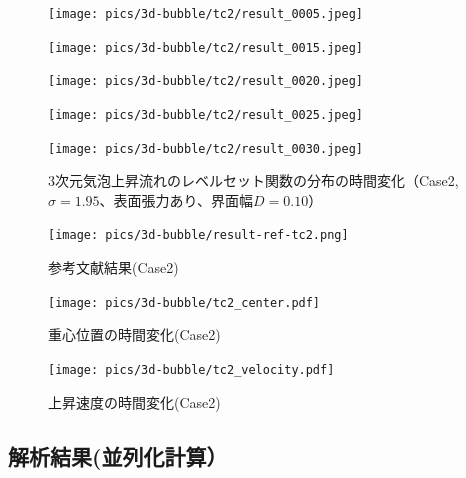 \begin{figure}[H]
	\centering
	\begin{minipage}[b]{0.16\columnwidth}
	    \centering
	    \texttt{[image: pics/3d-bubble/tc2/result\_0005.jpeg]}
	\end{minipage}
	\begin{minipage}[b]{0.16\columnwidth}
	    \centering
	    \texttt{[image: pics/3d-bubble/tc2/result\_0015.jpeg]}
	\end{minipage}
	\begin{minipage}[b]{0.16\columnwidth}
	    \centering
	    \texttt{[image: pics/3d-bubble/tc2/result\_0020.jpeg]}
	\end{minipage}
	\begin{minipage}[b]{0.16\columnwidth}
	    \centering
	    \texttt{[image: pics/3d-bubble/tc2/result\_0025.jpeg]}
	\end{minipage}
	\begin{minipage}[b]{0.16\columnwidth}
	    \centering
	    \texttt{[image: pics/3d-bubble/tc2/result\_0030.jpeg]}
	\end{minipage}

	\caption{3次元気泡上昇流れのレベルセット関数の分布の時間変化（Case2, $\sigma=1.95$、表面張力あり、界面幅$D=0.10$）}
	\label{fig:3d-bubble_result_tc2}
\end{figure}

\begin{figure}[H]
    \centering
	\texttt{[image: pics/3d-bubble/result-ref-tc2.png]}
	\caption{参考文献結果(Case2)\cite{Safi2017}}
	\label{fig:3d-bubble-result-ref}
\end{figure}

\begin{figure}[H]
	\centering
	\begin{minipage}[b]{0.49\columnwidth}
	    \centering
	    \texttt{[image: pics/3d-bubble/tc2\_center.pdf]}
		\caption{重心位置の時間変化(Case2)}
		\label{fig:3d-bubble-center-tc2}
	\end{minipage}
	\begin{minipage}[b]{0.49\columnwidth}
	    \centering
	    \texttt{[image: pics/3d-bubble/tc2\_velocity.pdf]}
		\caption{上昇速度の時間変化(Case2)}
		\label{fig:3d-bubble-velocity-tc2}
	\end{minipage}
\end{figure}

\newpage
\subsection{解析結果(並列化計算）}

